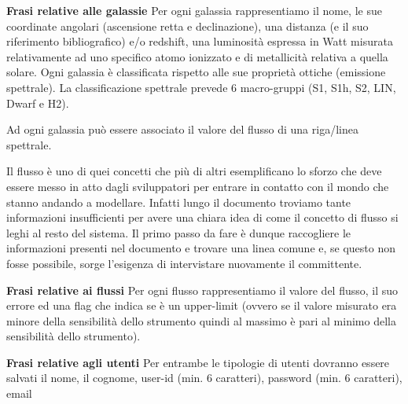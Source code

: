 \documentclass[12pt,a4paper,onecolumn]{article}
\begin{document}
	\begin{framed}
		\begin{flushleft}
			\textbf{Frasi relative alle galassie}\newline
			Per ogni galassia rappresentiamo il nome, le sue coordinate angolari (ascensione retta e declinazione), una distanza (e il suo riferimento bibliografico) e/o redshift, una luminosità espressa in Watt misurata relativamente ad uno specifico atomo ionizzato e di metallicità relativa a quella solare. 
			Ogni galassia è classificata rispetto alle sue proprietà ottiche (emissione spettrale). La classificazione spettrale prevede 6 macro-gruppi (S1, S1h, S2, LIN, Dwarf e H2).
			
			Ad ogni galassia può essere associato il valore del flusso di una riga/linea spettrale.
		\end{flushleft}
	\end{framed}
	
	Il flusso è uno di quei concetti che più di altri esemplificano lo sforzo che deve essere messo in atto dagli sviluppatori per entrare in contatto con il mondo che stanno andando a modellare. Infatti lungo il documento troviamo tante informazioni insufficienti per avere una chiara idea di come il concetto di flusso si leghi al resto del sistema. Il primo passo da fare è dunque raccogliere le informazioni presenti nel documento e trovare una linea comune e, se questo non fosse possibile, sorge l'esigenza di intervistare nuovamente il committente.
	
	\begin{framed}
		\begin{flushleft}
			\textbf{Frasi relative ai flussi}\newline
			Per ogni flusso rappresentiamo il valore del flusso, il suo errore ed una flag che indica se è un upper-limit (ovvero se il valore misurato era minore della sensibilità dello strumento quindi al massimo è pari al minimo della sensibilità dello strumento).\newline
		\end{flushleft}
	\end{framed}
	
	\begin{framed}
		\begin{flushleft}
			\textbf{Frasi relative agli utenti}\newline
			Per entrambe le tipologie di utenti dovranno essere salvati il nome, il cognome, user-id (min. 6 caratteri), password (min. 6 caratteri), email
		\end{flushleft}
	\end{framed}
\end{document}
